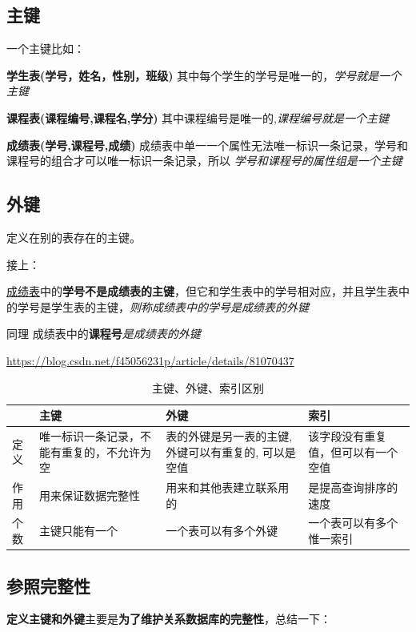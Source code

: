 \documentclass[UTF8,a4paper,12pt]{ctexbook}
\begin{document}
		\subsection{主键}
			一个主键比如：
			 
			\textbf{学生表(学号，姓名，性别，班级)} 其中每个学生的学号是唯一的，\textit{学号就是一个主键} 
			
			\textbf{课程表(课程编号,课程名,学分)} 其中课程编号是唯一的,\textit{课程编号就是一个主键} 
			
			\textbf{成绩表(学号,课程号,成绩)} 成绩表中单一一个属性无法唯一标识一条记录，学号和课程号的组合才可以唯一标识一条记录，所以 \textit{学号和课程号的属性组是一个主键} 
			
		\subsection{外键}
			定义在别的表存在的主键。
			
			接上：
			
			\underline{成绩表}中的\textbf{学号不是成绩表的主键}，但它和学生表中的学号相对应，并且学生表中的学号是学生表的主键，\textit{则称成绩表中的学号是成绩表的外键} 
			  
			同理 成绩表中的\textbf{课程号}\textit{是成绩表的外键} 
			
			\url{https://blog.csdn.net/f45056231p/article/details/81070437}
			
			\begin{table}[H]
				\centering
				\caption{主键、外键、索引区别}
				\begin{tabular}{p{0.5cm}<{\centering}|p{5cm}<{\centering}|p{5.5cm}<{\centering}|p{4.5cm}<{\centering}}
					\toprule[1.5pt]
							 & 主键 	&  外键 &  索引\\
					\midrule
						定义 & 唯一标识一条记录，不能有重复的，不允许为空   & 表的外键是另一表的主键, 外键可以有重复的, 可以是空值      & 该字段没有重复值，但可以有一个空值  \\
						\hline
						作用 & 用来保证数据完整性   &  用来和其他表建立联系用的     & 是提高查询排序的速度  \\
						\hline
						个数 & 主键只能有一个   & 一个表可以有多个外键      & 一个表可以有多个惟一索引  \\
					\bottomrule[1.5pt]
				\end{tabular}
			\end{table}
			
		\subsection{参照完整性}
			\textbf{定义主键和外键}主要是\textbf{为了维护关系数据库的完整性}，总结一下：
			
\end{document}
